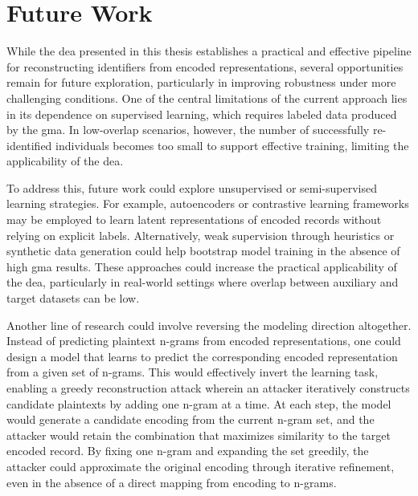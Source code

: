 
\section{Future Work}  \label{sec:future-work}

While the \ac{dea} presented in this thesis establishes a practical and effective pipeline for reconstructing identifiers from encoded representations, several opportunities remain for future exploration, particularly in improving robustness under more challenging conditions.
One of the central limitations of the current approach lies in its dependence on supervised learning, which requires labeled data produced by the \ac{gma}.
In low-overlap scenarios, however, the number of successfully re-identified individuals becomes too small to support effective training, limiting the applicability of the \ac{dea}.

To address this, future work could explore unsupervised or semi-supervised learning strategies.
For example, autoencoders or contrastive learning frameworks may be employed to learn latent representations of encoded records without relying on explicit labels.
Alternatively, weak supervision through heuristics or synthetic data generation could help bootstrap model training in the absence of high \ac{gma} results.
These approaches could increase the practical applicability of the \ac{dea}, particularly in real-world settings where overlap between auxiliary and target datasets can be low.

Another line of research could involve reversing the modeling direction altogether.
Instead of predicting plaintext n-grams from encoded representations, one could design a model that learns to predict the corresponding encoded representation from a given set of n-grams.
This would effectively invert the learning task, enabling a greedy reconstruction attack wherein an attacker iteratively constructs candidate plaintexts by adding one n-gram at a time.
At each step, the model would generate a candidate encoding from the current n-gram set, and the attacker would retain the combination that maximizes similarity to the target encoded record.
By fixing one n-gram and expanding the set greedily, the attacker could approximate the original encoding through iterative refinement, even in the absence of a direct mapping from encoding to n-grams.

